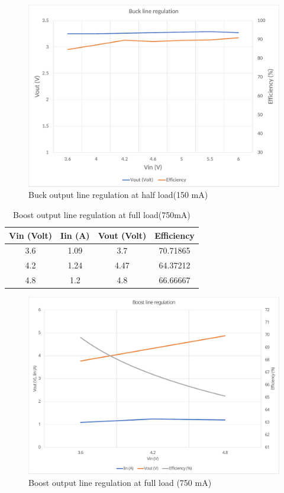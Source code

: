 \\
\begin{figure}[H]
	\centering
	\includegraphics[width=0.85\columnwidth]{IMGS/Buck output line regulation at half load (150mA).pdf}
	\caption{Buck output line regulation at half load(150 mA)}
	\label{fig:arch}
\end{figure}


\begin{table}[H]
\centering
\begin{tabular}{c c c c}
\toprule
Vin (Volt) & Iin (A) & Vout (Volt) & Efficiency \\ \midrule\midrule
3.6        & 1.09    & 3.7         & 70.71865   \\ 
4.2        & 1.24    & 4.47        & 64.37212   \\ 
4.8        & 1.2     & 4.8         & 66.66667   \\ 
\bottomrule
\end{tabular}
\caption{Boost output line regulation at full load(750mA)}
\label{table:4}
\end{table}


\begin{figure}[H]
	\centering
	\includegraphics[width=0.85\columnwidth]{IMGS/Boost output regulation at full load (750mA).pdf}
	\caption{Boost output line regulation at full load (750 mA)}
	\label{fig:arch}
\end{figure}


